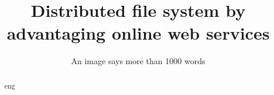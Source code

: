 \documentclass[english, biblatex]{templates/kth/kththesis}
\title{Distributed file system by advantaging online web services}
\subtitle{An image says more than 1000 words}
\begin{document}
%

\kthcover
\titlepage
\bookinfopage

\frontmatter
\setcounter{page}{1}
\begin{abstract}
  \markboth{\abstractname}{}
\begin{scontents}[store-env=lang]
eng
\end{scontents}
\begin{scontents}[store-env=abstracts,print-env=true]



\end{scontents}





\end{abstract}
\end{document}
